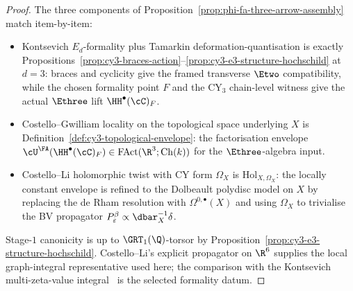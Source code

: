 \begin{proof}
The three components of Proposition~\ref{prop:phi-fa-three-arrow-assembly}
match item-by-item:
\begin{itemize}
\item[(a)] Kontsevich $E_d$-formality plus Tamarkin
deformation-quantisation is exactly
Propositions~\ref{prop:cy3-braces-action}--\ref{prop:cy3-e3-structure-hochschild}
at $d=3$: braces and cyclicity give the framed transverse $\Etwo$ compatibility,
while the chosen formality point $F$ and the CY$_3$ chain-level witness
give the actual $\Ethree$ lift $\HH^\bullet(\cC)_F$.
\item[(b)] Costello--Gwilliam locality on the topological space
underlying $X$ is Definition~\ref{def:cy3-topological-envelope}: the
factorisation envelope $\cU^\FA(\HH^\bullet(\cC)_F)\in\mathrm{FAct}(\R^3;
\mathrm{Ch}(k))$ for the $\Ethree$-algebra input.
\item[(c)] Costello--Li holomorphic twist with CY form $\Omega_X$ is
$\mathrm{Hol}_{X,\Omega_X}$: the locally constant envelope is refined
to the Dolbeault polydisc model on $X$ by replacing the de Rham
resolution with $\Omega^{0,\bullet}(X)$ and using $\Omega_X$ to
trivialise the BV propagator
$P^\beta_\varepsilon\propto\dbar_X^{-1}\delta$.
\end{itemize}
Stage-$1$ canonicity is up to $\GRT_1(\Q)$-torsor by
Proposition~\ref{prop:cy3-e3-structure-hochschild}. Costello--Li's
explicit propagator on $\R^6$ supplies the local graph-integral
representative used here; the comparison with the Kontsevich
multi-zeta-value integral~\cite{CostelloLi2016} is the selected
formality datum.
\end{proof}


